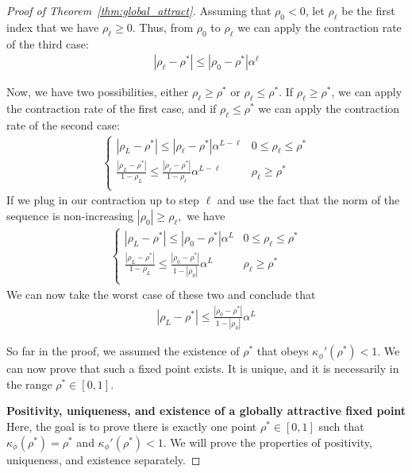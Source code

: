 \documentclass[twoside]{article}
\newcommand{\km}{\kappa_\phi}
\theoremstyle{definition}
\begin{document}
\begin{proof}[Proof of Theorem~\ref{thm:global_attract}]
Assuming that $\rho_0 < 0$, let $\rho_\ell$ be the first index that we have $\rho_\ell \ge 0$. Thus, from $\rho_0$ to $\rho_\ell$ we can apply the contraction rate of the third case:
\begin{align*}
|\rho_\ell - \rho^*| \le |\rho_0 - \rho^*| \alpha^\ell
\end{align*}

Now, we have two possibilities, either $\rho_\ell \ge \rho^*$ or $\rho_\ell \le \rho^*$. If $\rho_\ell \ge \rho^*$, we can apply the contraction rate of the first case, and if $\rho_\ell \le \rho^*$ we can apply the contraction rate of the second case:
\begin{align*}
    \begin{cases}
|\rho_L - \rho^*| \le |\rho_\ell - \rho^*| \alpha^{L-\ell} & 0\le \rho_\ell\le \rho^*\\
\frac{|\rho_L-\rho^*|}{1-\rho_L} \le \frac{|\rho_\ell-\rho^*|}{1-\rho_\ell}\alpha^{L-\ell} & \rho_\ell\ge \rho^* \\
    \end{cases}
\end{align*}
If we plug in our contraction up to step $\ell$ and use the fact that the norm of the sequence is non-increasing $|\rho_0|\ge \rho_\ell,$ we have
\begin{align*}
    \begin{cases}
|\rho_L - \rho^*| \le |\rho_0 - \rho^*| \alpha^{L} & 0\le \rho_\ell\le \rho^*\\
\frac{|\rho_L-\rho^*|}{1-\rho_L} \le \frac{|\rho_0-\rho^*|}{1-|\rho_0|}\alpha^{L} & \rho_\ell\ge \rho^* \\
    \end{cases}
\end{align*}
We can now take the worst case of these two and conclude that
\begin{align*}
|\rho_L - \rho^*| \le \frac{|\rho_0 - \rho^*|}{1-|\rho_0|} \alpha^L
\end{align*}

So far in the proof, we assumed the existence of $\rho^*$ that obeys $\km'(\rho^*)<1.$ We can now prove that such a fixed point exists. It is unique, and it is necessarily in the range $\rho^*\in [0,1].$

\textbf{Positivity, uniqueness, and existence of a globally attractive fixed point}
Here, the goal is to prove there is exactly one point $\rho^*\in[0,1]$ such that $\km(\rho^*) = \rho^*$ and $\km'(\rho^*) < 1.$ We will prove the properties of positivity, uniqueness, and existence separately.


\end{proof}
\end{document}
